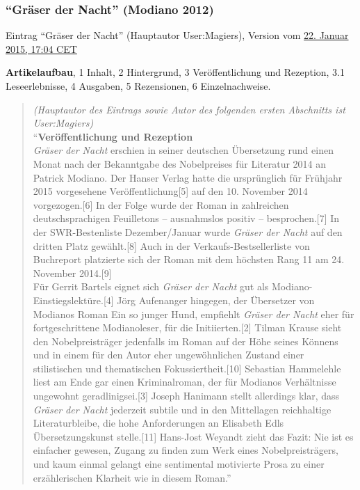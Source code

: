 \documentclass[fontsize=12pt]{scrartcl}
\begin{document}
\subsubsection{"`Gr\"aser der Nacht"' (Modiano 2012)}
\label{subsubsec:6.1.11}

Eintrag "`Gr\"aser der Nacht"' (Hauptautor\textsuperscript{\tiny *} \mbox{User}:Magiers), Version vom \href{https://de.wikipedia.org/w/index.php?title=Gr\%C3\%A4ser_der_Nacht\&oldid=138052609}{22. Januar 2015, 17:04 CET}

\textbf{Artikelaufbau}, 1 Inhalt, 2 Hintergrund, 3 Ver\"of\-fent\-lichung und Rezeption, 3.1 Leseerlebnisse, 4 Ausgaben, 5 Rezensionen, 6 Einzelnachweise.

\begin{quote}
\textit{(Hauptautor\textsuperscript{\tiny *} des Eintrags sowie Autor\textsuperscript{\tiny *} des folgenden ersten Abschnitts ist \mbox{User}:Magiers)}\\
"`\textbf{Ver\"of\-fent\-lichung und Rezeption}\\
\textit{Gr\"aser der Nacht} erschien in seiner deutschen \"Ubersetzung rund einen Monat nach der Bekanntgabe des Nobelpreises f\"ur Li\-te\-ra\-tur 2014 an Patrick Modiano. Der Hanser Verlag hatte die urspr\"ung\-lich f\"ur Fr\"uhjahr 2015 vorgesehene Ver\"of\-fent\-lichung[5] auf den 10. November 2014 vorgezogen.[6] In der Folge wurde der Roman in zahlreichen deutschspra\-chi\-gen Feuilletons -- ausnahmslos positiv -- besprochen.[7] In der SWR-Bestenliste Dezember/Januar wurde \textit{Gr\"aser der Nacht} auf den dritten Platz gew\"ahlt.[8] Auch in der Verkaufs-Bestsellerliste von Buchreport platzierte sich der Roman mit dem h\"ochsten Rang 11 am 24. November 2014.[9]\\
F\"ur Gerrit Bartels eignet sich \textit{Gr\"aser der Nacht} \flq gut als Modiano-Einstiegslekt\"ure\frq.[4] J\"org Aufenanger hingegen, der \"Ubersetzer von Modianos Roman Ein so junger Hund, empfiehlt \textit{Gr\"aser der Nacht} eher \flq f\"ur fortgeschrittene Modianoleser, f\"ur die Initiierten\frq.[2] Tilman Krause sieht den Nobelpreistr\"ager jedenfalls im Roman \flq auf der H\"ohe seines K\"onnens\frq \,\,und in einem f\"ur den Autor eher ungew\"ohnlichen \flq Zustand einer sti\-lis\-ti\-schen und thematischen Fokussiertheit\frq.[10] Sebastian Hammel\-eh\-le \mbox{liest} am En\-de gar einen Kriminalroman, der \flq f\"ur Modianos Verh\"altnisse ungewohnt geradlinig\frq sei.[3] Joseph Hanimann stellt al\-ler\-dings klar, dass \textit{Gr\"a\-ser der Nacht} jederzeit \flq subtile und in den Mittellagen reichhaltige Li\-te\-ra\-tur\frq bleibe, die hohe Anforderungen an Elisabeth Edls \"Uberset\-zungs\-kunst stelle.[11] Hans-Jost Weyandt zieht das Fazit: \flq Nie ist es einfacher gewesen, Zugang zu finden zum Werk eines Nobelpreistr\"agers, und kaum einmal gelangt eine sentimental motivierte Prosa zu einer erz\"ahlerischen Klarheit wie in diesem Roman.\frq[12]"'
\end{quote}
\end{document}
